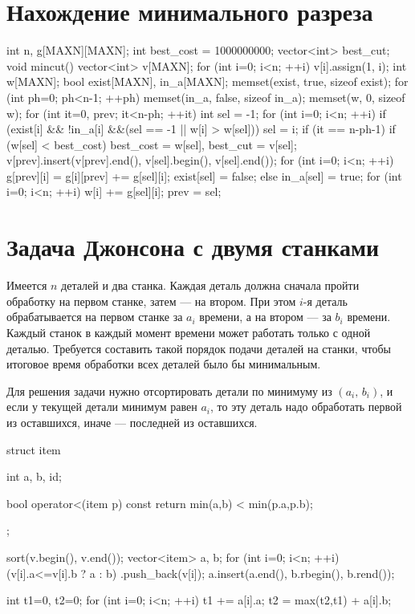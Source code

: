 \documentclass[12pt, titlepage]{article}
\begin{document}
\section{Нахождение минимального разреза}
\begin{cppcode}
int n, g[MAXN][MAXN];
int best_cost = 1000000000;
vector<int> best_cut;
 void mincut() {
    vector<int> v[MAXN];
    for (int i=0; i<n; ++i)
        v[i].assign(1, i);
    int w[MAXN];
    bool exist[MAXN], in_a[MAXN];
    memset(exist, true, sizeof exist);
    for (int ph=0; ph<n-1; ++ph) {
        memset(in_a, false, sizeof in_a);
        memset(w, 0, sizeof w);
        for (int it=0, prev; it<n-ph; ++it) {
            int sel = -1;
            for (int i=0; i<n; ++i)
                if (exist[i] && !in_a[i] &&(sel == -1 || w[i] > w[sel]))
                    sel = i;
            if (it == n-ph-1) {
                if (w[sel] < best_cost)
                    best_cost = w[sel],  best_cut = v[sel];
                v[prev].insert(v[prev].end(), v[sel].begin(), v[sel].end());
                for (int i=0; i<n; ++i)
                    g[prev][i] = g[i][prev] += g[sel][i];
                exist[sel] = false;
            }
            else {
                in_a[sel] = true;
                for (int i=0; i<n; ++i)
                    w[i] += g[sel][i];
                prev = sel;
            }
        }
    }
}
\end{cppcode}


\section{Задача Джонсона с двумя станками}

Имеется $n$ деталей и два станка. Каждая деталь должна сначала пройти обработку на первом станке, затем — на втором. При этом $i$-я деталь обрабатывается на первом станке за $a_i$ времени, а на втором — за $b_i$ времени. Каждый станок в каждый момент времени может работать только с одной деталью. Требуется составить такой порядок подачи деталей на станки, чтобы итоговое время обработки всех деталей было бы минимальным.

Для решения задачи нужно отсортировать детали по минимуму из $(a_i,\,b_i)$, и если у текущей детали минимум равен $a_i$, то эту деталь надо обработать первой из оставшихся, иначе — последней из оставшихся.

\begin{cppcode}
struct item {
    int a, b, id;
 
    bool operator<(item p) const {
        return min(a,b) < min(p.a,p.b);
    }
};
 
 
sort(v.begin(), v.end());
vector<item> a, b;
for (int i=0; i<n; ++i)
   (v[i].a<=v[i].b ? a : b) .push_back(v[i]);
a.insert(a.end(), b.rbegin(), b.rend());
 
int t1=0, t2=0;
for (int i=0; i<n; ++i) {
    t1 += a[i].a;
    t2 = max(t2,t1) + a[i].b;
}
\end{cppcode}
\end{document}
